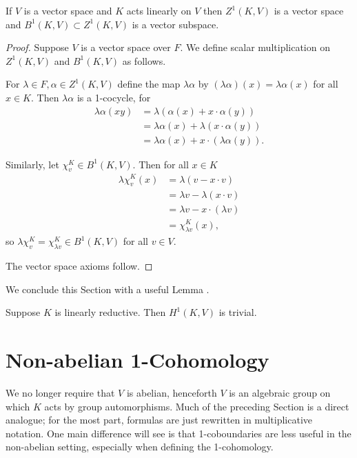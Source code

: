 \begin{lemma} \label{vspace} If $V$ is a vector space and $K$ acts linearly on $V$ then $Z^1(K, V)$ is a vector space and $B^1(K, V)\subset Z^1(K, V)$ is a vector subspace.
\end{lemma}
\begin{proof}
	Suppose $V$ is a vector space over $F$. We define scalar multiplication on $Z^1(K, V)$ and $B^1(K, V)$ as follows.

For $\lambda \in F, \alpha \in Z^1(K, V)$ define the map $\lambda\alpha$ by $(\lambda\alpha)(x) = \lambda\alpha(x)$ for all $x \in K$. Then $\lambda\alpha$ is a 1-cocycle, for
\begin{align*}
	\lambda \alpha(xy) &= \lambda\left( \alpha(x) + x \cdot \alpha(y)\right) \\
	&= \lambda\alpha(x) + \lambda(x\cdot \alpha(y)) \\
	&= \lambda\alpha(x) + x \cdot (\lambda\alpha(y)).
\end{align*}

Similarly, let $\chi^K_v \in B^1(K, V)$. Then for all $x \in K$
\begin{align*}
	\lambda\chi^K_v(x) &= \lambda\left(v - x \cdot v\right) \\
		&= \lambda v - \lambda(x \cdot v) \\
		&= \lambda v - x \cdot (\lambda v) \\
		&= \chi^K_{\lambda v}(x),
\end{align*}
so $\lambda\chi^K_v = \chi^K_{\lambda v} \in B^1(K, V)$ for all $v \in V$.

The vector space axioms follow.
\end{proof}

We conclude this Section with a useful Lemma \cite[Proposition 1]{kemper2000characterization}.
\begin{lemma} Suppose $K$ is linearly reductive. Then $H^1(K, V)$ is trivial.
  \label{lem:lin_red_h}
\end{lemma}

\section{Non-abelian 1-Cohomology}
	
We no longer require that $V$ is abelian, henceforth $V$ is an algebraic group on which $K$ acts by group automorphisms. Much of the preceding Section is a direct analogue; for the most part, formulas are just rewritten in multiplicative notation.
One main difference will see is that 1-coboundaries are less useful in the non-abelian setting, especially when defining the 1-cohomology.

